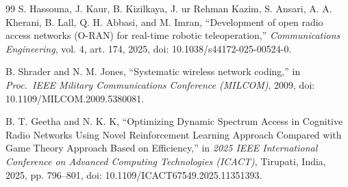 \documentclass[journal]{IEEEtran}
\begin{document}
\begin{thebibliography}{99}
 S. Hassouna, J. Kaur, B. Kizilkaya, J. ur Rehman Kazim, S. Ansari, A. A. Kherani, B. Lall, Q. H. Abbasi, and M. Imran, ``Development of open radio access networks (O-RAN) for real-time robotic teleoperation,'' \textit{Communications Engineering}, vol. 4, art. 174, 2025, doi: 10.1038/s44172-025-00524-0.

 B. Shrader and N. M. Jones, ``Systematic wireless network coding,'' in \textit{Proc.\ IEEE Military Communications Conference (MILCOM)}, 2009, doi: 10.1109/MILCOM.2009.5380081.

B. T. Geetha and N. K. K,
``Optimizing Dynamic Spectrum Access in Cognitive Radio Networks Using Novel Reinforcement Learning Approach Compared with Game Theory Approach Based on Efficiency,''
in \textit{2025 IEEE International Conference on Advanced Computing Technologies (ICACT)},
Tirupati, India, 2025, pp. 796--801,
doi: 10.1109/ICACT67549.2025.11351393.

\end{thebibliography}
\end{document}
